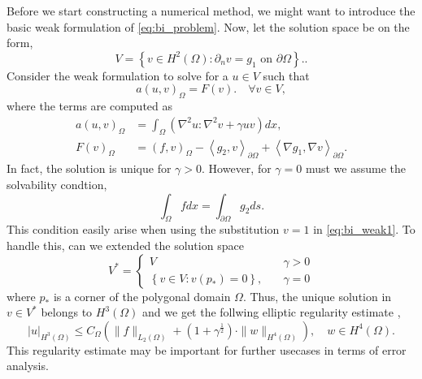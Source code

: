 Before we start constructing a numerical method, we might want to introduce the basic weak formulation of \eqref{eq:bi_problem}. Now, let the solution space be on the form,
\begin{equation*}
V = \left\{ v \in H^2\left( \Omega  \right) : \partial _{n} v = g_{1}  \text{ on }
\partial \Omega  \right\}.
.\end{equation*}
Consider the weak formulation to solve for a $u \in  V$ such that
\begin{equation}
    \label{eq:bi_weak1}
a\left( u,v \right)_{\Omega } = F(v).\quad \forall v \in
V,
\end{equation}
where the terms are computed as \[
    \begin{split}
a\left( u,v \right)_{\Omega } & = \int_{\Omega }^{} \left( \nabla ^2 u : \nabla ^2 v  +
\gamma u v \right) dx , \\
F\left( v \right)_{\Omega } & = \left( f,v \right)_{\Omega } - \left<g_{2},v \right>_{\partial \Omega } + \left<\nabla g_{1}, \nabla v \right>_{\partial \Omega }.
    \end{split}
\]
In fact, the solution is unique for $\gamma > 0$. However, for $\gamma = 0$ must we assume the solvability condtion,
\begin{equation*}
 \int_{\Omega }^{} f dx = \int_{\partial \Omega }^{} g_{2} ds
.\end{equation*}
This condition easily arise when using the substitution $v=1$ in \eqref{eq:bi_weak1}. To handle this, can we extended the solution space \[
V^{*} = \begin{cases}
    V \quad & \gamma > 0 \\
    \left\{ v \in V: v\left( p_{*} \right)  = 0\right\}, \quad & \gamma = 0
\end{cases}
\]
where $p_{*}$ is a corner of the polygonal domain $\Omega $.
Thus, the unique solution in $v \in V^{*}$ belongs to $H^{3 }\left( \Omega  \right) $ and we get the follwing
elliptic regularity estimate \cite{gu2012c0},
\begin{equation}
\label{eq:bi_harmonic_ellitpic_regularity}
\left| u \right| _{H^{3 }\left( \Omega  \right) }  \le C_{\Omega } \left( \| f \|_{  L_{2}( \Omega ) }^{  } + ( 1 + \gamma ^{\frac{1}{2}}
) \cdot \| w  \|_{ H^{4}\left( \Omega  \right)  }^{  }    \right), \quad w\in H^{4}\left( \Omega  \right).
\end{equation}
This regularity estimate may be important for further usecases in terms of error analysis.

